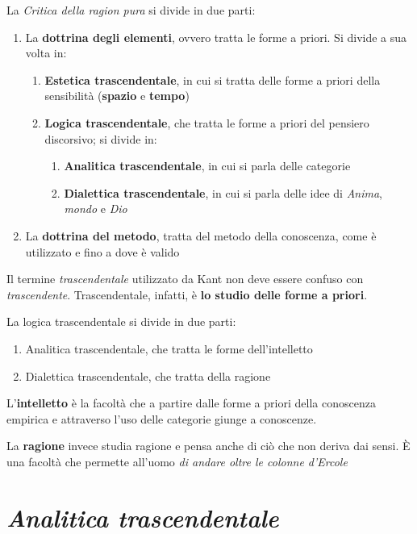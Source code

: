 \documentclass[a4paper, twoside, titlepage]{book}
\begin{document}
La \textit{Critica della ragion pura} si divide in due parti:
\begin{enumerate}
\item La \textbf{dottrina degli elementi}, ovvero tratta le forme a priori. Si divide a sua volta in:
 \begin{enumerate}
  \item \textbf{Estetica trascendentale}, in cui si tratta delle forme a priori della sensibilità (\textbf{spazio} e \textbf{tempo})
  \item \textbf{Logica trascendentale}, che tratta le forme a priori del pensiero discorsivo; si divide in:
   \begin{enumerate}
    \item \textbf{Analitica trascendentale}, in cui si parla delle categorie
    \item \textbf{Dialettica trascendentale}, in cui si parla delle idee di \textit{Anima}, \textit{mondo} e \textit{Dio}
   \end{enumerate}
   \end{enumerate}
\item La \textbf{dottrina del metodo}, tratta del metodo della conoscenza, come è utilizzato e fino a dove è valido
\end{enumerate}

Il termine \textit{trascendentale} utilizzato da Kant non deve essere confuso con \textit{trascendente}. Trascendentale, infatti, è \textbf{lo studio delle forme a priori}.

La logica trascendentale si divide in due parti:
\begin{enumerate}
\item Analitica trascendentale, che tratta le forme dell’intelletto
\item Dialettica trascendentale, che tratta della ragione
\end{enumerate}

L’\textbf{intelletto} è la facoltà che a partire dalle forme a priori della conoscenza empirica e attraverso l’uso delle categorie giunge a conoscenze.

La \textbf{ragione} invece studia ragione e pensa anche di ciò che non deriva dai sensi. È una facoltà che permette all’uomo \textit{di andare oltre le colonne d’Ercole}

\section{\textit{Analitica trascendentale}}
\end{document}
